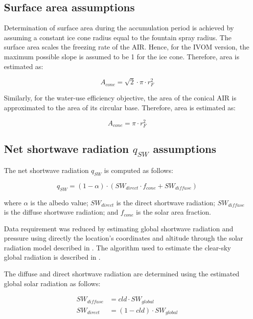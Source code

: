 \subsection{Surface area assumptions}

Determination of surface area during the accumulation period is achieved by assuming a constant ice cone
radius equal to the fountain spray radius. The surface area scales the freezing rate of the \ac{AIR}. Hence, for the
IVOM version, the maximum possible slope is assumed to be 1 for the ice cone. Therefore, area is estimated as:  

\begin{equation} A_{cone} =\sqrt{2} \cdot \pi \cdot r_{F}^2  \end{equation}

Similarly, for the water-use efficiency objective, the area of the conical \ac{AIR} is approximated to the area of
its circular base. Therefore, area is estimated as:

\begin{equation} A_{cone} =\pi \cdot r_{F}^2  \end{equation}

\subsection{Net shortwave radiation \texorpdfstring{$q_{SW}$}{Lg} assumptions}
\label{sec:SW}

The net shortwave radiation $q_{SW}$ is computed as follows:

\begin{equation} 
q_{SW} = (1- \alpha) \cdot ( SW_{direct} \cdot f_{cone} + SW_{diffuse})
\end{equation}

where $\alpha$ is the albedo value; $SW_{direct}$ is the direct shortwave radiation; $SW_{diffuse}$ is the
diffuse shortwave radiation; and $f_{cone}$ is the solar area fraction.

Data requirement was reduced by estimating global shortwave radiation and pressure using directly the
location's coordinates and altitude through the solar radiation model described in
\citet{holmgrenPvlibPythonPython2018}. The algorithm used to estimate the clear-sky global radiation is
described in \citet{ineichenBroadbandSimplifiedVersion2008}.  

The diffuse and direct shortwave radiation are determined using the estimated global solar radiation as follows:

\begin{equation}
\begin{split}
  SW_{diffuse} &= cld \cdot SW_{global}\\
  SW_{direct} &= (1-cld) \cdot SW_{global}
\end{split}
\end{equation}

